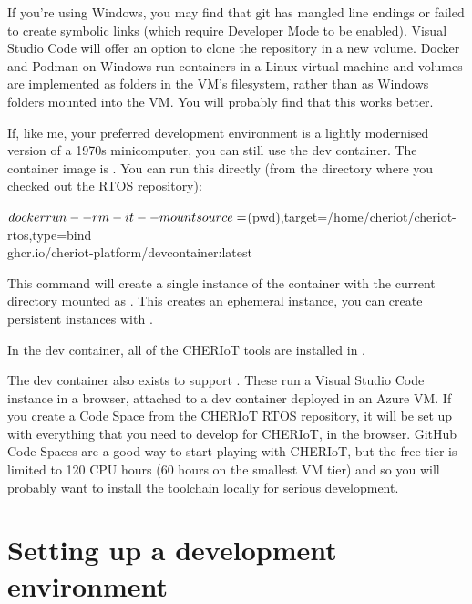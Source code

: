 \begin{caution}
	If you're using Windows, you may find that git has mangled line endings or failed to create symbolic links (which require Developer Mode to be enabled).
	Visual Studio Code will offer an option to clone the repository in a new volume.
	Docker and Podman on Windows run containers in a Linux virtual machine and volumes are implemented as folders in the VM's filesystem, rather than as Windows folders mounted into the VM.
	You will probably find that this works better.
\end{caution}

If, like me, your preferred development environment is a lightly modernised version of a 1970s minicomputer, you can still use the dev container.
The container image is .
You can run this directly (from the directory where you checked out the RTOS repository):

\begin{console}
$ docker run --rm -it \\
	--mount source=$(pwd),target=/home/cheriot/cheriot-rtos,type=bind \\
	ghcr.io/cheriot-platform/devcontainer:latest
\end{console}

This command will create a single instance of the container with the current directory mounted as .
This creates an ephemeral instance, you can create persistent instances with .

In the dev container, all of the CHERIoT tools are installed in .

\begin{note}
	The dev container also exists to support .
	These run a Visual Studio Code instance in a browser, attached to a dev container deployed in an Azure VM.
	If you create a Code Space from the CHERIoT RTOS repository, it will be set up with everything that you need to develop for CHERIoT, in the browser.
	GitHub Code Spaces are a good way to start playing with CHERIoT, but the free tier is limited to 120 CPU hours (60 hours on the smallest VM tier) and so you will probably want to install the toolchain locally for serious development.
\end{note}

\section{Setting up a development environment}

